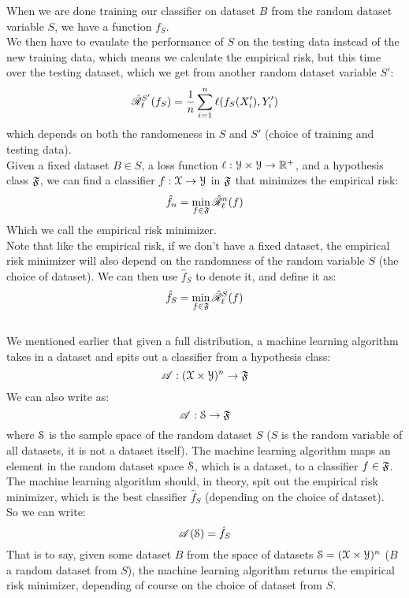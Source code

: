 \documentclass[12pt]{article}
\begin{document}
When we are done training our classifier
on dataset $B$ from the random dataset variable $S$,
we have a function $f_S$. \\
We then have to evaulate the performance of $S$
on the testing data instead of the new training data,
which means we calculate the empirical risk,
but this time over the testing dataset,
which we get from another random dataset variable $S'$:
\[ \hat{\mathscr{R}}_\ell^{S'}(f_S)
= \dfrac{1}{n}\sum_{i = 1}^{n}\ell(f_S(X_i'), Y_i') \]
which depends on both the randomeness in $S$
and $S'$
(choice of training and testing data). \\

Given a fixed dataset $B \in S$,
a loss function $\ell: \mathcal{Y} \times \mathcal{Y} \to \mathbb{R}^+$,
and a hypothesis class $\mathfrak{F}$,
we can find a classifier $f: \mathcal{X} \to \mathcal{Y}$
in $\mathfrak{F}$ that minimizes the empirical risk:
\[ \hat{f}_n = 
\min_{f \in \mathfrak{F}} \hat{\mathscr{R}}_\ell^n(f) \]
Which we call the empirical risk minimizer. \\

Note that like the empirical risk,
if we don't have a fixed dataset,
the empirical risk minimizer will also
depend on the randomness of the
random variable $S$ (the choice of dataset).
We can then use $\hat{f}_S$ to denote it,
and define it as:
\[ \hat{f}_S = 
\min_{f \in \mathfrak{F}} \hat{\mathscr{R}}_\ell^{S}(f) \] \\

We mentioned earlier that given a full
distribution, a machine learning algorithm
takes in a dataset and spits out
a classifier from a hypothesis class:
\[ \mathscr{A}: (\mathcal{X} \times \mathcal{Y})^n \to \mathfrak{F} \]
We can also write as:
\[ \mathscr{A}: \mathcal{S} \to \mathfrak{F} \]
where $\mathcal{S}$ is the sample space of
the random dataset $S$
($S$ is the random variable
of all datasets,
it is not a dataset itself).
The machine learning algorithm maps 
an element in the random dataset space $\mathcal{S}$,
which is a dataset,
to a classifier $f \in \mathfrak{F}$. \\

The machine learning algorithm should,
in theory, spit out the empirical
risk minimizer, which is the best
classifier $\hat{f}_S$ (depending on the
choice of dataset). \\
So we can write:
\[ \mathscr{A}(\mathcal{S}) = \hat{f}_S \]
That is to say,
given some dataset $B$ from the
space of datasets $\mathcal{S} = (\mathcal{X} \times \mathcal{Y})^n$
($B$ a random dataset from $S$),
the machine learning algorithm 
returns the empirical risk minimizer,
depending of course on the choice
of dataset from $S$. \\
\end{document}
